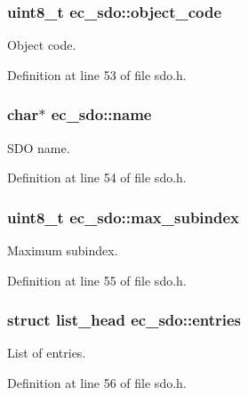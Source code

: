 \subsubsection[{object\-\_\-code}]{\setlength{\rightskip}{0pt plus 5cm}uint8\-\_\-t {\bf ec\-\_\-sdo\-::object\-\_\-code}}\label{structec__sdo_ad1e3b4f7b9d26d163289b7ab6b36b011}


\-Object code. 



\-Definition at line 53 of file sdo.\-h.

\subsubsection[{name}]{\setlength{\rightskip}{0pt plus 5cm}char$\ast$ {\bf ec\-\_\-sdo\-::name}}\label{structec__sdo_a4dae1d2cd41ce8ab4407097ed7844472}


\-S\-D\-O name. 



\-Definition at line 54 of file sdo.\-h.

\subsubsection[{max\-\_\-subindex}]{\setlength{\rightskip}{0pt plus 5cm}uint8\-\_\-t {\bf ec\-\_\-sdo\-::max\-\_\-subindex}}\label{structec__sdo_ad493bab8f7ef1179d41172bbc445c77e}


\-Maximum subindex. 



\-Definition at line 55 of file sdo.\-h.

\subsubsection[{entries}]{\setlength{\rightskip}{0pt plus 5cm}struct list\-\_\-head {\bf ec\-\_\-sdo\-::entries}}\label{structec__sdo_a9f7c6b8967a84ba8686f1eb851019b4f}


\-List of entries. 



\-Definition at line 56 of file sdo.\-h.

